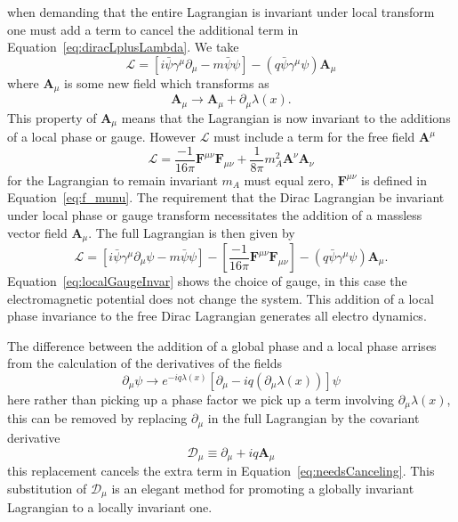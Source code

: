 when demanding that the entire Lagrangian is invariant under local transform 
one must add a term to cancel the additional term in 
Equation~\eqref{eq:diracLplusLambda}. We take
\begin{equation}
  \mathcal{L} = \left[i\bar{\psi}\gamma^{\mu}\partial_{\mu} - m \bar{\psi}\psi\right] - \left(q\bar{\psi}\gamma^{\mu}\psi\right)\bm{A}_{\mu}
\end{equation}
where $\bm{A}_{\mu}$ is some new field which transforms as
\begin{equation}
  \bm{A}_{\mu}\rightarrow \bm{A}_{\mu} + \partial_{\mu}\lambda(x).
  \label{eq:localGaugeInvar}
\end{equation}
This property of $\bm{A}_{\mu}$ means that the Lagrangian is now invariant to 
the additions of a local phase or gauge. However $\mathcal{L}$ must include a 
term for the free field $\bm{A}^{\mu}$
\begin{equation}
  \mathcal{L} = \frac{-1}{16\pi}\bm{F}^{\mu\nu}\bm{F}_{\mu\nu} + \frac{1}{8\pi}m_{A}^{2}\bm{A}^{\nu}\bm{A}_{\nu}
\end{equation}
for the Lagrangian to remain invariant $m_{A}$ must equal zero, $\bm{F}^{\mu\nu}$ is defined in Equation~\eqref{eq:f_munu}. The requirement 
that the Dirac Lagrangian be invariant under local phase or gauge transform 
necessitates the addition of a massless vector field $\bm{A}_{\mu}$. The full Lagrangian is then given by
\begin{equation}
  \mathcal{L} = \left[i\bar{\psi}\gamma^{\mu}\partial_{\mu}\psi - m \bar{\psi}\psi\right] - \left[\frac{-1}{16\pi}\bm{F}^{\mu\nu}\bm{F}_{\mu\nu}\right] - \left(q\bar{\psi}\gamma^{\mu}\psi\right)\bm{A}_{\mu}.
\end{equation}
Equation~\eqref{eq:localGaugeInvar} shows the choice of gauge, in this case the 
electromagnetic potential does not change the system. This addition of a local 
phase invariance to the free Dirac Lagrangian generates all electro dynamics.

The difference between the addition of a global phase and a local phase arrises 
from the calculation of the derivatives of the fields
\begin{equation}
  \partial_{\mu}\psi\rightarrow e^{-iq\lambda(x)}\left[\partial_{\mu}- iq\left(\partial_{\mu}\lambda(x)\right)\right]\psi
  \label{eq:needsCanceling}
\end{equation}
here rather than picking up a phase factor we pick up a term involving 
$\partial_{\mu}\lambda(x)$, this can be removed by replacing $\partial_{\mu}$ 
in the full Lagrangian by the covariant derivative
\begin{equation}
  \mathcal{D}_{\mu} \equiv \partial_{\mu} + iq\bm{A}_{\mu}
\end{equation}
this replacement cancels the extra term in Equation~\eqref{eq:needsCanceling}. 
This substitution of $\mathcal{D}_{\mu}$ is an elegant method for promoting a 
globally invariant Lagrangian to a locally invariant one.

